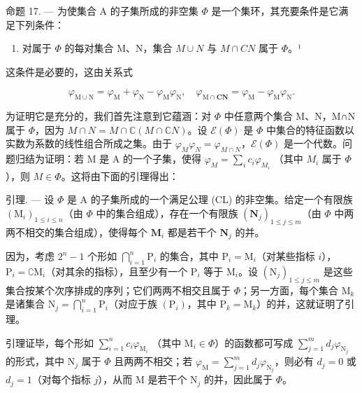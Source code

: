 命题 17. --- 为使集合 A 的子集所成的非空集 \(\Phi\) 是一个集环，其充要条件是它满足下列条件：

\begin{enumerate}
\def\labelenumi{(\Roman{enumi})}
\setcounter{enumi}{149}
\tightlist
\item
  对属于 \(\Phi\) 的每对集合 M、N，集合 \(M\cup N\) 与 \(M\cap CN\) 属于 \(\Phi\)。¹
\end{enumerate}

这条件是必要的，这由关系式

\[
\varphi_ {\mathrm{M} \cup \mathrm{N}} = \varphi_ {\mathrm{M}} + \varphi_ {\mathrm{N}} - \varphi_ {\mathrm{M}} \varphi_ {\mathrm{N}}, \quad \varphi_ {\mathrm{M} \cap \mathbf {C N}} = \varphi_ {\mathrm{M}} - \varphi_ {\mathrm{M}} \varphi_ {\mathrm{N}}.
\]

为证明它是充分的，我们首先注意到它蕴涵：对 \(\Phi\) 中任意两个集合 M、N，M∩N 属于 \(\Phi\)，因为 \(M\cap N=M\cap\mathbb{C}(M\cap\mathbb{C}N)\)。设 \(\mathcal{E}(\Phi)\) 是 \(\Phi\) 中集合的特征函数以实数为系数的线性组合所成之集。由于 \(\varphi_{M}\varphi_{N}=\varphi_{M\cap N}\)，\(\mathcal{E}(\Phi)\) 是一个代数。问题归结为证明：若 M 是 A 的一个子集，使得 \(\varphi_{M}=\sum_{i}c_{i}\varphi_{M_{i}}\) （其中 \(M_{i}\) 属于 \(\Phi\)），则 \(M\in\Phi\)。这将由下面的引理得出：

引理. --- 设 \(\Phi\) 是 A 的子集所成的一个满足公理 (CL) 的非空集。给定一个有限族 \((\mathrm{M}_i)_{1 \leqslant i \leqslant n}\)（由 \(\Phi\) 中的集合组成），存在一个有限族 \((\mathbf{N}_j)_{1\leqslant j\leqslant m}\)（由 \(\Phi\) 中两两不相交的集合组成），使得每个 \(\mathbf{M}_i\) 都是若干个 \(\mathbf{N}_j\) 的并。

因为，考虑 \(2^{n} - 1\) 个形如 \(\bigcap_{i=1}^{n} \mathrm{P}_{i}\) 的集合，其中 \(\mathrm{P}_{i} = \mathrm{M}_{i}\)（对某些指标 \(i\)），\(\mathrm{P}_{i} = \complement \mathrm{M}_{i}\)（对其余的指标），且至少有一个 \(\mathrm{P}_{i}\) 等于 \(\mathrm{M}_{i}\)。设 \((\mathrm{N}_{j})_{1 \leqslant j \leqslant m}\) 是这些集合按某个次序排成的序列；它们两两不相交且属于 \(\Phi\)；另一方面，每个集合 \(\mathrm{M}_{k}\) 是诸集合 \(\mathrm{N}_{j} = \bigcap_{i=1}^{n} \mathrm{P}_{i}\)（对应于族 \((\mathrm{P}_{i})\)，其中 \(\mathrm{P}_{k} = \mathrm{M}_{k}\)）的并，这就证明了引理。

引理证毕，每个形如 \(\sum_{i=1}^{n} c_i \varphi_{\mathrm{M}_i}\) （其中 \(\mathrm{M}_i \in \Phi\)）的函数都可写成 \(\sum_{j=1}^{m} d_j \varphi_{\mathrm{N}_j}\) 的形式，其中 \(\mathrm{N}_j\) 属于 \(\Phi\) 且两两不相交；若 \(\varphi_{\mathrm{M}} = \sum_{j=1}^{m} d_j \varphi_{\mathrm{N}_j}\)，则必有 \(d_j = 0\) 或 \(d_j = 1\)（对每个指标 \(j\)），从而 \(\mathrm{M}\) 是若干个 \(\mathrm{N}_j\) 的并，因此属于 \(\Phi\)。

